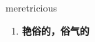 
\begin{frame}
{\huge meretricious}
\begin{center}
\begin{enumerate}\Large
  \item \textbf{艳俗的，俗气的}
\end{enumerate}
\end{center}
\end{frame}
